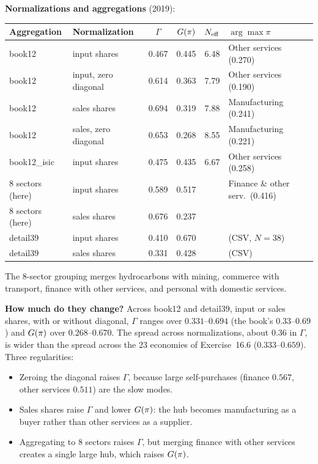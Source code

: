 \documentclass[../solutions_manual.tex]{subfiles}
\begin{document}
\textbf{Normalizations and aggregations} (2019):
\begin{center}
\small\setlength{\tabcolsep}{3pt}
\begin{tabular}{llcccl}
\toprule
Aggregation & Normalization & $\Gamma$ & $G(\pi)$ & $N_{\text{eff}}$ & $\arg\max\pi$ \\
\midrule
book12 & input shares & 0.467 & 0.445 & 6.48 & Other services (0.270) \\
book12 & input, zero diagonal & 0.614 & 0.363 & 7.79 & Other services (0.190) \\
book12 & sales shares & 0.694 & 0.319 & 7.88 & Manufacturing (0.241) \\
book12 & sales, zero diagonal & 0.653 & 0.268 & 8.55 & Manufacturing (0.221) \\
book12\_isic & input shares & 0.475 & 0.435 & 6.67 & Other services (0.258) \\
8 sectors (here) & input shares & 0.589 & 0.517 & & Finance \& other serv.\ (0.416) \\
8 sectors (here) & sales shares & 0.676 & 0.237 & & \\
detail39 & input shares & 0.410 & 0.670 & & (CSV, $N = 38$) \\
detail39 & sales shares & 0.331 & 0.428 & & (CSV) \\
\bottomrule
\end{tabular}
\end{center}
The 8-sector grouping merges hydrocarbons with mining, commerce with transport, finance with other services, and personal with domestic services.

\textbf{How much do they change?} Across book12 and detail39, input or sales shares, with or without diagonal, $\Gamma$ ranges over $0.331$--$0.694$ (the book's $0.33$--$0.69$) and $G(\pi)$ over $0.268$--$0.670$. The spread across normalizations, about $0.36$ in $\Gamma$, is wider than the spread across the 23 economies of Exercise~16.6 ($0.333$--$0.659$). Three regularities:
\begin{itemize}
\item Zeroing the diagonal raises $\Gamma$, because large self-purchases (finance $0.567$, other services $0.511$) are the slow modes.
\item Sales shares raise $\Gamma$ and lower $G(\pi)$: the hub becomes manufacturing as a buyer rather than other services as a supplier.
\item Aggregating to 8 sectors raises $\Gamma$, but merging finance with other services creates a single large hub, which raises $G(\pi)$.
\end{itemize}
\end{document}
